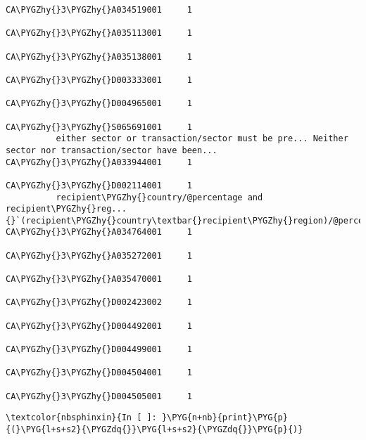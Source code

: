 \documentclass[letterpaper,10pt,english]{sphinxmanual}
\begin{document}
\begin{Verbatim}[commandchars=\\\{\}]
                                                                                                                CA\PYGZhy{}3\PYGZhy{}A034519001     1
                                                                                                                CA\PYGZhy{}3\PYGZhy{}A035113001     1
                                                                                                                CA\PYGZhy{}3\PYGZhy{}A035138001     1
                                                                                                                CA\PYGZhy{}3\PYGZhy{}D003333001     1
                                                                                                                CA\PYGZhy{}3\PYGZhy{}D004965001     1
                                                                                                                CA\PYGZhy{}3\PYGZhy{}S065691001     1
          either sector or transaction/sector must be pre... Neither sector nor transaction/sector have been... CA\PYGZhy{}3\PYGZhy{}A033944001     1
                                                                                                                CA\PYGZhy{}3\PYGZhy{}D002114001     1
          recipient\PYGZhy{}country/@percentage and recipient\PYGZhy{}reg... {}`(recipient\PYGZhy{}country\textbar{}recipient\PYGZhy{}region)/@percenta... CA\PYGZhy{}3\PYGZhy{}A034764001     1
                                                                                                                CA\PYGZhy{}3\PYGZhy{}A035272001     1
                                                                                                                CA\PYGZhy{}3\PYGZhy{}A035470001     1
                                                                                                                CA\PYGZhy{}3\PYGZhy{}D002423002     1
                                                                                                                CA\PYGZhy{}3\PYGZhy{}D004492001     1
                                                                                                                CA\PYGZhy{}3\PYGZhy{}D004499001     1
                                                                                                                CA\PYGZhy{}3\PYGZhy{}D004504001     1
                                                                                                                CA\PYGZhy{}3\PYGZhy{}D004505001     1
\end{Verbatim}

\begin{Verbatim}[commandchars=\\\{\}]
\textcolor{nbsphinxin}{In [ ]: }\PYG{n+nb}{print}\PYG{p}{(}\PYG{l+s+s2}{\PYGZdq{}}\PYG{l+s+s2}{\PYGZdq{}}\PYG{p}{)}
\end{Verbatim}
\end{document}
